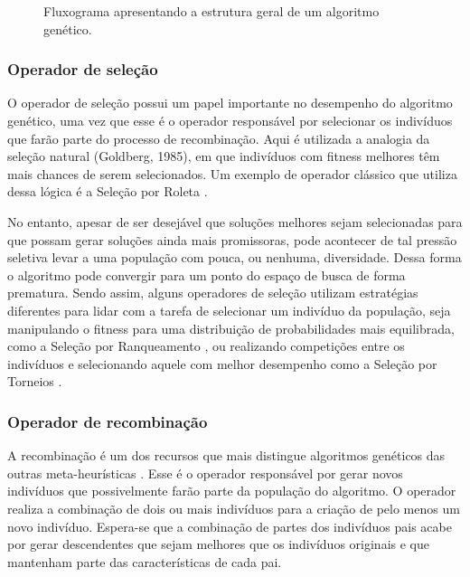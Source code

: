 \begin{figure}[htb]
\centering

\caption{Fluxograma apresentando a estrutura geral de um algoritmo genético.}

\end{figure}

\subsubsection{Operador de seleção}
O operador de seleção possui um papel importante no desempenho do algoritmo genético, uma vez que esse é o operador responsável por selecionar os indivíduos que farão parte do processo de recombinação.  Aqui é utilizada a analogia da seleção natural (Goldberg, 1985), em que indivíduos com fitness melhores têm mais chances de serem selecionados. Um exemplo de operador clássico que utiliza dessa lógica é a Seleção por Roleta \cite{Talbi2009, Kacprzyk2015, Luke2013Metaheuristics}.

No entanto, apesar de ser desejável que soluções melhores sejam selecionadas para que possam gerar soluções ainda mais promissoras, pode acontecer de tal pressão seletiva levar a uma população com pouca, ou nenhuma, diversidade. Dessa forma o algoritmo pode convergir para um ponto do espaço de busca de forma prematura. Sendo assim, alguns operadores de seleção utilizam estratégias diferentes para lidar com a tarefa de selecionar um indivíduo da população, seja manipulando o fitness para uma distribuição de probabilidades mais equilibrada, como a Seleção por Ranqueamento \cite{Talbi2009, Kacprzyk2015}, ou realizando competições entre os indivíduos e selecionando aquele com melhor desempenho como a Seleção por Torneios \cite{Talbi2009, Kacprzyk2015}. 

\subsubsection{Operador de recombinação}
A recombinação é um dos recursos que mais distingue algoritmos genéticos das outras meta-heurísticas \cite{Luke2013Metaheuristics}. Esse é o operador responsável por gerar novos indivíduos que possivelmente farão parte da população do algoritmo. O operador realiza a combinação de dois ou mais indivíduos para a criação de pelo menos um novo indivíduo. Espera-se que a combinação de partes dos indivíduos pais acabe por gerar descendentes que sejam melhores que os indivíduos originais \cite{Kacprzyk2015} e que mantenham parte das características de cada pai.

